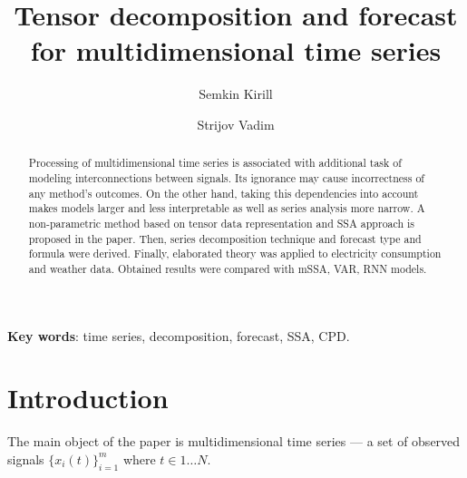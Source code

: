 
\usepackage[backend=biber, sorting=none]{biblatex}
\usepackage{subfigure}
\usepackage{authblk}



\theoremstyle{definition}
\newtheorem*{Def}{Definition}
\theoremstyle{plain}
\newtheorem{Lem}{Lemma}
\newtheorem{Th}{Theorem}

\newcommand{\delayV}[1]{\overset{\leftarrow}{\mathbf{x}}_{#1}}
\newcommand{\delayM}[1]{\overset{\leftarrow}{\mathbf{X}}_{#1}}

\title{Tensor decomposition and forecast for multidimensional time series}

\author[1]{Semkin Kirill}
\author[2]{Strijov Vadim}


\date{}


	
	\maketitle
	
	\begin{abstract}
		
		Processing of multidimensional time series is associated with additional task of modeling interconnections between signals. Its ignorance may cause incorrectness of any method's outcomes. On the other hand, taking this dependencies into account makes models larger and less interpretable as well as series analysis more narrow. A non-parametric method based on tensor data representation and SSA approach is proposed in the paper. Then, series decomposition technique and forecast type and formula were derived. Finally, elaborated theory was applied to electricity consumption and weather data. Obtained results were compared with mSSA, VAR, RNN models.
		
	\end{abstract}
	
	\textbf{Key words}: {\small time series, decomposition, forecast, SSA, CPD}.
	
	\section{Introduction}\label{Intro}
	
	The main object of the paper is multidimensional time series --- a set of observed signals $ \{x_i(t)\}_{i=1}^m $ where $ t \in 1 \ldots N $. %
	
